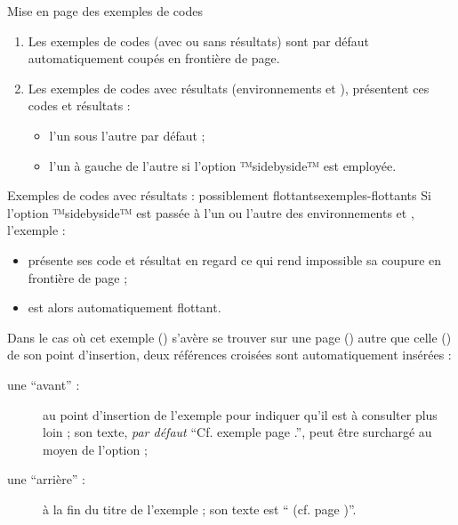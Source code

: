 \documentclass{letgut}
\begin{document}
\begin{dbremark}{Mise en page des exemples de codes}{}
  \begin{enumerate}
  \item Les exemples de codes (avec ou sans résultats) sont par défaut
    automatiquement coupés en frontière de page.
  \item Les exemples de codes avec résultats (environnements
     et ), présentent
    ces codes et résultats :
    \begin{itemize}
    \item l'un sous l'autre par défaut ;
    \item l'un à gauche de l'autre si l'option ™sidebyside™ est
      employée.
    \end{itemize}
  \end{enumerate}
\end{dbremark}

\begin{dbwarning}{Exemples de codes avec résultats : possiblement
    flottants}{exemples-flottants}
  Si l'option ™sidebyside™ est passée à l'un ou l'autre des
  environnements  et ,
  l'exemple :
  \begin{itemize}
  \item présente ses code et résultat en regard ce qui rend impossible sa
    coupure en frontière de page ;
  \item est alors automatiquement flottant.
  \end{itemize}
  Dans le cas où cet exemple (\no{}) s'avère se trouver sur une page
  () autre que celle () de son point d'insertion, deux
  références croisées sont automatiquement insérées :
  \begin{description}
  \item[une \enquote{avant} :] au point d'insertion de l'exemple pour indiquer
    qu'il est à consulter plus loin ; son texte, \emph{par défaut}
    \enquote{Cf. exemple  page .}, peut être surchargé au moyen
    de l'option  ;
  \item[une \enquote{arrière} :] à la fin du titre de l'exemple ; son texte est
    \enquote{ (cf. page )}.
  \end{description}
\end{dbwarning}
\end{document}
